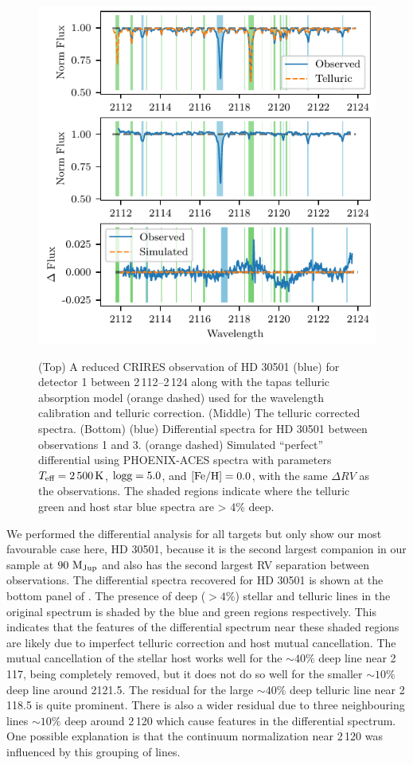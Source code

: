    \begin{figure}
        \centering
        \includegraphics[width=0.8\hsize]{figures/direct-recovery/differential.pdf}\\
        \caption{(Top) A reduced {CRIRES} observation of {HD 30501} (blue) for detector 1 between 2\,112--2\,124\nm{} along with the tapas telluric absorption model ({orange} dashed) used for the wavelength calibration and telluric correction. (Middle) The telluric corrected spectra. (Bottom) ({blue}) Differential spectra for {HD 30501} between observations 1 and 3. ({orange} dashed) Simulated ``perfect'' differential using {PHOENIX-ACES} spectra with parameters \(T_{\textrm{eff}} = 2\,500\,\si{\kelvin}{}\), \(\rm logg=5.0\), and \(\rm \feh{}=0.0\), with the same \(\Delta {RV}\) as the observations. The shaded regions indicate where the telluric {green} and host star {blue} spectra are > 4\% deep.}
        \label{fig:spectral_example}
    \end{figure}

    We performed the differential analysis for all targets but only show our most favourable case here, {HD 30501}, because it is the second largest companion in our sample at \(\rm 90~M_{Jup}\) and also has the second largest {RV} separation between observations. The differential spectra recovered for {HD 30501} is shown at the bottom panel of . The presence of deep (\(>4\%\)) stellar and telluric lines in the original spectrum is shaded by the blue and green regions respectively. This indicates that the features of the differential spectrum near these shaded regions are likely due to imperfect telluric correction and host mutual cancellation.
    The mutual cancellation of the stellar host works well for the \(\sim40\%\) deep line near 2\,117\nm{}, being completely removed, but it does not do so well for the smaller \(\sim10\%\) deep line around 2121.5\nm{}. The residual for the large \(\sim40\%\) deep telluric line near 2\,118.5\nm{} is quite prominent. There is also a wider residual due to three neighbouring lines \(\sim10\%\) deep around 2\,120\nm{} which cause features in the differential spectrum. One possible explanation is that the continuum normalization near 2\,120\nm{} was influenced by this grouping of lines.

